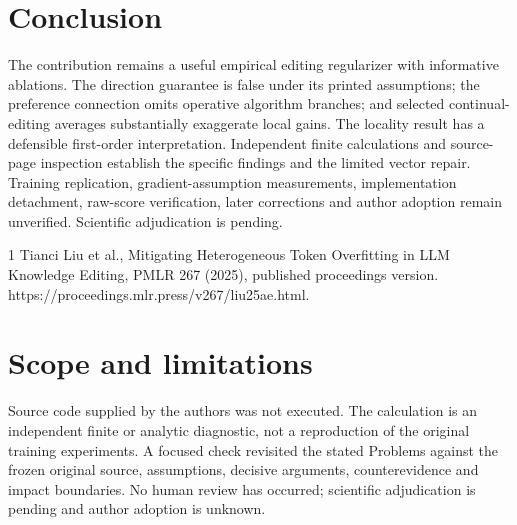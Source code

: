 \documentclass[10pt]{article}
\begin{document}
\section*{Conclusion}
The contribution remains a useful empirical editing regularizer with informative ablations. The direction guarantee is false under its printed assumptions; the preference connection omits operative algorithm branches; and selected continual-editing averages substantially exaggerate local gains. The locality result has a defensible first-order interpretation. Independent finite calculations and source-page inspection establish the specific findings and the limited vector repair. Training replication, gradient-assumption measurements, implementation detachment, raw-score verification, later corrections and author adoption remain unverified. Scientific adjudication is pending.\par
1 Tianci Liu et al., Mitigating Heterogeneous Token Overfitting in LLM Knowledge Editing, PMLR 267 (2025), published proceedings version. https://proceedings.mlr.press/v267/liu25ae.html.\par
\section*{Scope and limitations}
Source code supplied by the authors was not executed. The calculation is an independent finite or analytic diagnostic, not a reproduction of the original training experiments. A focused check revisited the stated Problems against the frozen original source, assumptions, decisive arguments, counterevidence and impact boundaries. No human review has occurred; scientific adjudication is pending and author adoption is unknown.\par
\end{document}
